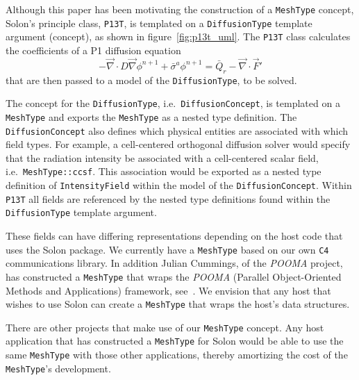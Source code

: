 \documentclass[reqno]{lanl}
\newcommand{\del}{\ensuremath{\vec{\nabla}}}
\begin{document}
Although this paper has been motivating the construction of a \texttt{MeshType}
concept, Solon's principle class, \texttt{P13T}, is templated on a
\texttt{DiffusionType} template argument (concept), as shown in
figure~\ref{fig:p13t_uml}.
The \texttt{P13T} class calculates the coefficients of a P1 diffusion equation
\begin{equation}
  \label{eq:p1diffusion}
     - \del \cdot D \del \phi^{n+1} +  \bar{\sigma}^{a} \phi^{n+1}
                = \bar{Q}_{r} - \del \cdot \vec{F}'
\end{equation}
that are then passed to a model of the \texttt{DiffusionType}, to be solved.

The concept for the \texttt{DiffusionType}, i.e.\ \texttt{DiffusionConcept},
is templated on a
\texttt{MeshType} and exports the \texttt{MeshType} as a nested type definition.
The \texttt{DiffusionConcept}
also defines which physical entities are associated
with which field types.
For example, a cell-centered orthogonal diffusion solver would
specify that the radiation intensity be associated with a cell-centered
scalar field, i.e.\ \texttt{MeshType::ccsf}.
This association would be exported as a nested type definition of
\texttt{IntensityField} within the model of the \texttt{DiffusionConcept}.
Within \texttt{P13T} all fields are referenced by the nested type definitions
found within the \texttt{DiffusionType} template argument.

These fields can have differing representations depending on the host
code that uses the Solon package.
We currently have a \texttt{MeshType} based on our own \texttt{C4}
communications library.
In addition Julian Cummings, of the \emph{POOMA} project, has constructed
a \texttt{MeshType} that wraps the \emph{POOMA} (Parallel Object-Oriented
Methods and Applications) framework,
see~\cite{Reynders96}.
We envision that any host that wishes to use Solon can create
a \texttt{MeshType} that wraps the host's data structures.

There are other projects that make use of our
\texttt{MeshType} concept.
Any host application that has constructed a \texttt{MeshType} for
Solon would be able to use the same \texttt{MeshType} with those other
applications, thereby amortizing the cost of the \texttt{MeshType}'s
development.
\end{document}
